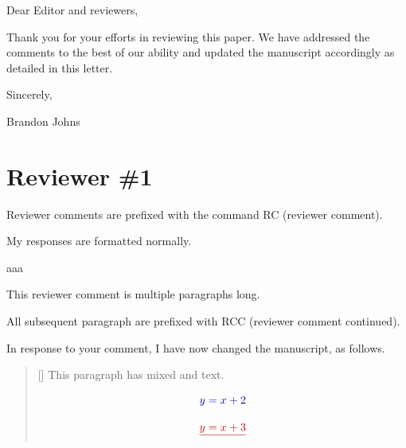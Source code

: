 \documentclass{AuthorResponse}
\newcommand{\arMatchCitationNumbers}{}
\begin{document}
\pagestyle{arPageStyle}
\thispagestyle{arPageStyleFirst}
\arLegend
\arMatchCitationNumbers

Dear Editor and reviewers,

Thank you for your efforts in reviewing this paper. We have addressed the comments to the best of our ability and updated the manuscript accordingly as detailed in this letter.

Sincerely,

Brandon Johns

\section{Reviewer \#1}
\RC Reviewer comments are prefixed with the command RC (reviewer comment). 

My responses are formatted normally.


aaa

\RC This reviewer comment is multiple paragraphs long.

\RCC All subsequent paragraph are prefixed with RCC (reviewer comment continued). 

In response to your comment, I have now changed the manuscript, as follows.

\begin{quote}[]
	This paragraph has mixed  and  text.



	\begin{equation} %
		\DIFadd{y = x + 2}
	\end{equation}

	\begin{equation} %
		\DIFdel{y = x + 3}
	\end{equation}
\end{quote}
\end{document}
